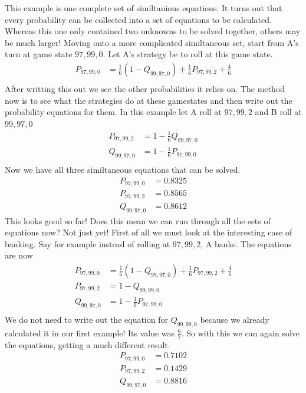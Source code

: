 \documentclass[a4paper,titlepage]{article}
\begin{document}
This example is one complete set of similtanious equations. It turns out that every probability can be collected into a set of equations to be calculated.
Whereas this one only contained two unknowns to be solved together, others may be much larger!
Moving onto a more complicated similtaneous set, start from A's turn at game state $97,99,0$. Let A's strategy be to roll at this game state.
\begin{align*}
	P_{97,99,0} &= \frac{1}{6}(1 - Q_{99,97,0})+\frac{1}{6}P_{97,99,2}+\frac{4}{6}\\
\end{align*}
After writting this out we see the other probabilities it relies on. The method now is to see what the strategies do at these gamestates and then write out the probability equations for them.
In this example let A roll at $97,99,2$ and B roll at $99,97,0$
\begin{align*}
	P_{97,99,2} &= 1 - \frac{1}{6}Q_{99,97,0}\\
	Q_{99,97,0} &= 1 - \frac{1}{6}P_{97,99,0}\\
\end{align*}
Now we have all three similtaneous equations that can be solved.
\begin{align*}
	P_{97,99,0} &= 0.8325\\
	P_{97,99,2} &= 0.8565\\
	Q_{99,97,0} &= 0.8612
\end{align*}
This looks good so far! Does this mean we can run through all the sets of equations now?
Not just yet! First of all we must look at the interesting case of banking. Say for example instead of rolling at $97,99,2$, A banks.
The equations are now
\begin{align*}
	P_{97,99,0} &= \frac{1}{6}(1 - Q_{99,97,0})+\frac{1}{6}P_{97,99,2}+\frac{4}{6}\\
	P_{97,99,2} &= 1 - Q_{99,99,0}\\
	Q_{99,97,0} &= 1 - \frac{1}{6}P_{97,99,0}\\
\end{align*}
We do not need to write out the equation for $Q_{99,99,0}$ because we already calculated it in our first example! Its value was $\frac{6}{7}$.
So with this we can again solve the equations, getting a much different result.
\begin{align*}
	P_{97,99,0} &= 0.7102\\
	P_{97,99,2} &= 0.1429\\
	Q_{99,97,0} &= 0.8816
\end{align*}
\end{document}
